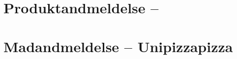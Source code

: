 \begin{minipage}[t]{100mm}
\vspace{1mm}
\section*{Produktandmeldelse -- }

\vspace{1mm}
\section*{Madandmeldelse -- Unipizzapizza}
\vspace{2mm}



\end{minipage}

